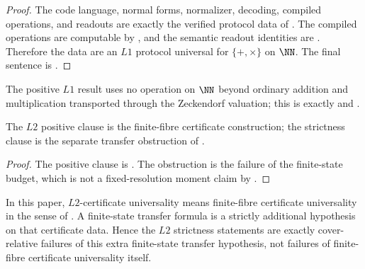 \begin{proof}
The code language, normal forms, normalizer, decoding, compiled operations, and
readouts are exactly the verified protocol data of
.  The compiled operations are computable by
,
and the semantic readout identities are .  Therefore the
data are an \(L1\) protocol universal for \(\{+,\times\}\) on \(\NN\).  The final
sentence is .
\end{proof}

The positive \(L1\) result uses no operation on \(\NN\) beyond ordinary addition
and multiplication transported through the Zeckendorf valuation; this is exactly
 and .


\begin{corollary}\label{cor:L2-load-split}
The \(L2\) positive clause is the finite-fibre certificate construction; the
strictness clause is the separate transfer obstruction of .
\end{corollary}

\begin{proof}
The positive clause is .  The obstruction is the
failure of the finite-state budget, which is not a fixed-resolution moment
claim by
.
\end{proof}

\begin{proposition}
\label{thm:L2-terminology-bridge}
In this paper, \(L2\)-certificate universality means finite-fibre certificate
universality in the sense of .  A finite-state transfer
formula is a strictly additional hypothesis on that certificate data.  Hence the
\(L2\) strictness statements are exactly cover-relative failures of this extra
finite-state transfer hypothesis, not failures of finite-fibre certificate
universality itself.
\end{proposition}

